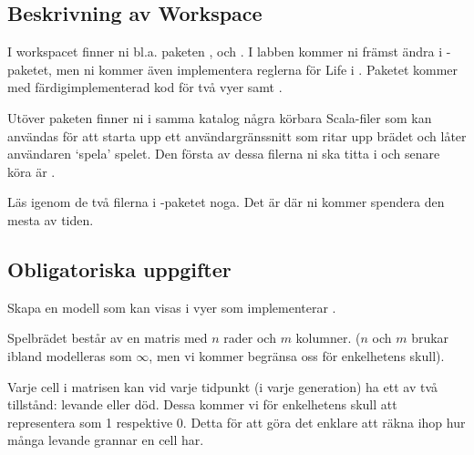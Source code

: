 \subsection{Beskrivning av Workspace}

I workspacet finner ni bl.a. paketen ,  och . I labben kommer ni främst ändra i -paketet, men ni kommer även implementera reglerna för Life i . Paketet  kommer med färdigimplementerad kod för två vyer  samt .

Utöver paketen finner ni i samma katalog några körbara Scala-filer som kan användas för att starta upp ett användargränssnitt som ritar upp brädet och låter användaren `spela' spelet. Den första av dessa filerna ni ska titta i och senare köra är .

Läs igenom de två filerna i -paketet noga. Det är där ni kommer spendera den mesta av tiden.


\subsection{Obligatoriska uppgifter}


\Task Skapa en modell som kan visas i vyer som implementerar .

Spelbrädet består av en matris med $n$ rader och $m$ kolumner. ($n$ och $m$ brukar ibland modelleras som $\infty$, men vi kommer begränsa oss för enkelhetens skull).

Varje cell i matrisen kan vid varje tidpunkt (i varje generation) ha ett av två tillstånd: levande eller död. Dessa kommer vi för enkelhetens skull att representera som 1 respektive 0. Detta för att göra det enklare att räkna ihop hur många levande grannar en cell har.

